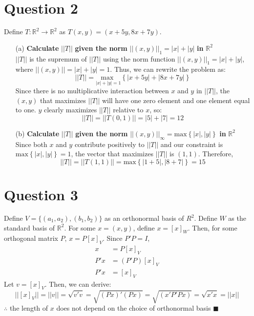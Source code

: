 \documentclass{article}
\newcommand{\R}{\mathbb{R}}
\begin{document}

\section*{Question 2}
Define $T:\R^2\rightarrow\R^2$ as $T(x,y)=(x+5y,8x+7y)$.
\begin{itemize}
	\item[(a)] \textbf{Calculate} $||T||$ \textbf{given the norm} $||(x,y)||_1=|x|+|y|$ \textbf{in} $\R^2$
		\medskip \\
		$||T||$ is the supremum of $||T||$ using the norm function $||(x,y)||_1=|x|+|y|$, where $||(x,y)||=|x|+|y|=1$. Thus, we can rewrite the problem as:
		\[
			||T|| = \underset{|x|+|y|=1}{\text{max }}\left\{|x + 5y| + |8x + 7y|\right\}
		\]
		Since there is no multiplicative interaction between $x$ and $y$ in $||T||$, the $(x,y)$ that maximizes $||T||$ will have one zero element and one element equal to one. $y$ clearly maximizes $||T||$ relative to $x$, so:
		\[
			||T||=||T(0,1)||=|5| + |7|=12
		\]
	
	\item[(b)] \textbf{Calculate} $||T||$ \textbf{given the norm} $||(x,y)||_\infty=\text{max}\left\{|x|,|y|\right\}$ \textbf{in} $\R^2$
		\medskip \\
		Since both $x$ and $y$ contribute positively to $||T||$ and our constraint is $\text{max}\left\{|x|,|y|\right\}=1$, the vector that maximizes $||T||$ is $(1,1)$. Therefore,
		\[
			||T||=||T(1,1)||=\text{max}\left\{|1+5|,|8+7|\right\}=15
		\]
\end{itemize}





\section*{Question 3}
Define $V=\{(a_1,a_2),(b_1,b_2)\}$ as an orthonormal basis of $R^2$. Define $W$ as the standard basis of $\R^2$. For some $x=(x,y)$, define $x=[x]_W$. Then, for some orthogonal matrix $P$, $x=P[x]_V$. Since $P'P=I$,
\begin{align*}
	x	&=P[x]_V		\\
	P'x&=(P'P)[x]_V		\\
	P'x&=[x]_V
\end{align*}
Let $v=[x]_V$. Then, we can derive:
\[
	||[x]_V||=||v||=\sqrt{v'v}=\sqrt{(Px)'(Px)}=\sqrt{(x'P'Px)}=\sqrt{x'x}=||x||
\]
$\therefore$ the length of $x$ does not depend on the choice of orthonormal basis $\blacksquare$
\end{document}
